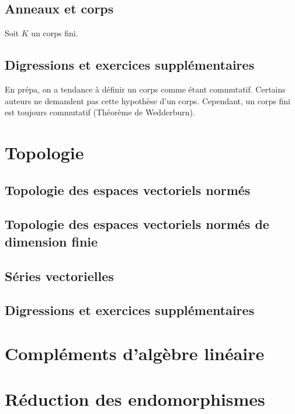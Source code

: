 \documentclass[12pt,a4paper]{exo_book}
\begin{document}
\section{Anneaux et corps}

\begin{exo}
    Soit $K$ un corps fini.
\end{exo}

\section{Digressions et exercices supplémentaires}

En prépa, on a tendance à définir un corps comme étant commutatif. Certains auteurs ne demandent pas cette hypothèse d'un corps. Cependant, un corps fini est toujours commutatif (Théorème de Wedderburn).



\chapter{Topologie}

\section{Topologie des espaces vectoriels normés}

\section{Topologie des espaces vectoriels normés de dimension finie}

\section{Séries vectorielles}

\section{Digressions et exercices supplémentaires}


\chapter{Compléments d'algèbre linéaire}

\chapter{Réduction des endomorphismes}
\end{document}
